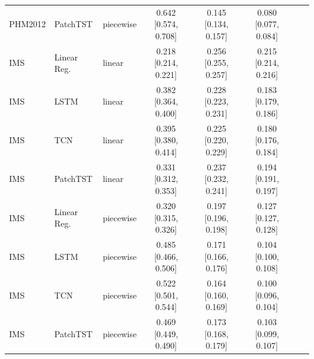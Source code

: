 \begin{table}[!ht]
{\begin{tabular}{lllccccc}
PHM2012 & PatchTST & piecewise & 0.642 [0.574, 0.708] & 0.145 [0.134, 0.157] & 0.080 [0.077, 0.084] \\
IMS & Linear Reg. & linear & 0.218 [0.214, 0.221] & 0.256 [0.255, 0.257] & 0.215 [0.214, 0.216] \\
IMS & LSTM & linear & 0.382 [0.364, 0.400] & 0.228 [0.223, 0.231] & 0.183 [0.179, 0.186] \\
IMS & TCN & linear & 0.395 [0.380, 0.414] & 0.225 [0.220, 0.229] & 0.180 [0.176, 0.184] \\
IMS & PatchTST & linear & 0.331 [0.312, 0.353] & 0.237 [0.232, 0.241] & 0.194 [0.191, 0.197] \\
IMS & Linear Reg. & piecewise & 0.320 [0.315, 0.326] & 0.197 [0.196, 0.198] & 0.127 [0.127, 0.128] \\
IMS & LSTM & piecewise & 0.485 [0.466, 0.506] & 0.171 [0.166, 0.176] & 0.104 [0.100, 0.108] \\
IMS & TCN & piecewise & 0.522 [0.501, 0.544] & 0.164 [0.160, 0.169] & 0.100 [0.096, 0.104] \\
IMS & PatchTST & piecewise & 0.469 [0.449, 0.490] & 0.173 [0.168, 0.179] & 0.103 [0.099, 0.107] \\
\bottomrule
\end{tabular}}
\end{table}
